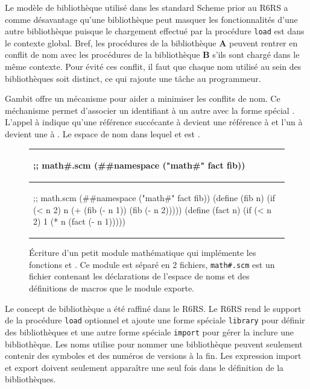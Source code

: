 Le modèle de bibliothèque utilisé dans les standard Scheme prior au
R6RS\cite{Scheme:R6RS} a comme désavantage qu'une bibliothèque peut masquer les
fonctionnalités d'une autre bibliothèque puisque le chargement effectué par la
procédure \texttt{load} est dans le contexte global. Bref, les procédures de la
bibliothèque \textbf{A} peuvent rentrer en conflit de nom avec les procédures
de la bibliothèque \textbf{B} s'ils sont chargé dans le même contexte.  Pour
évité ces conflit, il faut que chaque nom utilisé au sein des bibliothèques
soit distinct, ce qui rajoute une tâche au programmeur.


Gambit offre un mécanisme pour aider a minimiser les conflits de nom. Ce
méchanisme permet d'associer un identifiant à un autre avec la forme spécial
.  L'appel à  indique
qu'une référence succécante à  devient une référence à
 et l'un à  devient une à . Le espace
de nom dans lequel  et  est .

\begin{center}
  \begin{figure}[h]
  \begin{tabular}{|l|}
\hline
\begin{mplisting}{0.5}
;; math#.scm
(##namespace ("math#" fact fib))
\end{mplisting} \\\hline
\begin{mplisting}{0.6}
;; math.scm
(##namespace ("math#" fact fib))
(define (fib n)
  (if (< n 2)
    n
    (+ (fib (- n 1)) (fib (- n 2)))))
(define (fact n)
  (if (< n 2)
    1
    (* n (fact (- n 1)))))
\end{mplisting}\\\hline
  \end{tabular}
  \caption{Écriture d'un petit module mathématique qui implémente les fonctions 
    et . Ce module est séparé en 2 fichiers, \texttt{math\#.scm} est un fichier
    contenant les déclarations de l'espace de noms et des définitions de macros que le module
    exporte.}
  \label{fig:math_module1}
\end{figure}
\end{center}


Le concept de bibliothèque a été raffiné  dans le R6RS.  Le R6RS rend le
support de la procédure \texttt{load} optionnel et ajoute une forme spéciale
\texttt{library} pour définir des bibliothèques et une autre forme spéciale
\texttt{import} pour gérer la inclure une bibliothèque.  Les noms utilise
pour nommer une bibliothèque peuvent seulement contenir des symboles et des
numéros de versions à la fin. Les expression import et export doivent seulement
apparaître une seul fois dans le définition de la bibliothèques.

